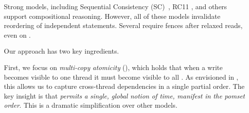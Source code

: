 

Strong models, including Sequential Consistency
(SC)~\citep{Lamport:1979:MMC:1311099.1311750}, RC11
\citep{DBLP:conf/pldi/LahavVKHD17}, and others
\citep{Dolan:2018:BDR:3192366.3192421,DBLP:conf/pldi/LahavVKHD17,DBLP:conf/lics/JeffreyR16,Boehm:2014:OGA:2618128.2618134}
support compositional reasoning.  However, all of these models invalidate
reordering of independent statements.  Several require fences after relaxed
reads, even on \armeight.




Our approach has two key ingredients.  

First, we focus on \emph{multi-copy atomicity} (\mca), which holds that when
a write becomes visible to one thread it must become visible to
all
\citep{DBLP:journals/pacmpl/PulteFDFSS18}.  As envisioned in
\cite[]{AlglaveThesis}, this allows us to capture cross-thread
dependencies in a single partial order.  The key insight is that \emph{\mca{}
  permits a single, global notion of time, manifest in the pomset order}.
This is a dramatic simplification over other models.

